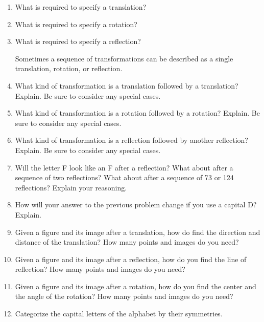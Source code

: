 %


\begin{problems}
\begin{enumerate}

\item What is required to specify a translation?  
\item What is required to specify a rotation? 
\item What is required to specify a reflection?  

Sometimes a sequence of transformations can be described as a single translation, rotation, or reflection.  

\item What kind of transformation is a translation followed by a translation?  Explain.  Be sure to consider any special cases.  
\item What kind of transformation is a rotation followed by a rotation?  Explain.  Be sure to consider any special cases.   
\item What kind of transformation is a reflection followed by another reflection?  Explain.  Be sure to consider any special cases.  

\item Will the letter F look like an F after a reflection?  What about after a sequence of two reflections?  What about after a sequence of 73 or 124 reflections?  Explain your reasoning.  

\item How will your answer to the previous problem change if you use a capital D?  Explain.  

\item Given a figure and its image after a translation, how do find the direction and distance of the translation?    How many points and images do you need?  
\item Given a figure and its image after a reflection, how do you find the line of reflection?  How many points and images do you need?  
\item Given a figure and its image after a rotation, how do you find the center and the angle of the rotation?  How many points and images do you need?  

\item Categorize the capital letters of the alphabet by their symmetries.  


\end{enumerate}
\end{problems}
